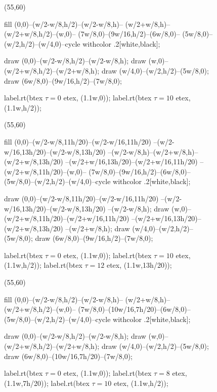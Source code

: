 \documentclass{manual}
\begin{document}
\begin{empfile}
\begin{figure}[tb]
  \centering
  \begin{empdef}(55,60)

    fill (0,0)--(w/2-w/8,h/2)--(w/2-w/8,h)--
         (w/2+w/8,h)--(w/2+w/8,h/2)--(w,0)--
         (7w/8,0)--(9w/16,h/2)--(6w/8,0)--
         (5w/8,0)--(w/2,h/2)--(w/4,0)--cycle
         withcolor .2[white,black];

    draw (0,0)--(w/2-w/8,h/2)--(w/2-w/8,h);
    draw (w,0)--(w/2+w/8,h/2)--(w/2+w/8,h);
    draw (w/4,0)--(w/2,h/2)--(5w/8,0);
    draw (6w/8,0)--(9w/16,h/2)--(7w/8,0);

    label.rt(btex $\tau=0$ etex, (1.1w,0));
    label.rt(btex $\tau=10$ etex, (1.1w,h/2));
  \end{empdef}
  \begin{empdef}(55,60)

    fill  (0,0)--(w/2-w/8,11h/20)--(w/2-w/16,11h/20)
         --(w/2-w/16,13h/20)--(w/2-w/8,13h/20)
         --(w/2-w/8,h)--(w/2+w/8,h)--(w/2+w/8,13h/20)
         --(w/2+w/16,13h/20)--(w/2+w/16,11h/20)
         --(w/2+w/8,11h/20)--(w,0)--
         (7w/8,0)--(9w/16,h/2)--(6w/8,0)--
         (5w/8,0)--(w/2,h/2)--(w/4,0)--cycle
         withcolor .2[white,black];

    draw (0,0)--(w/2-w/8,11h/20)--(w/2-w/16,11h/20)
         --(w/2-w/16,13h/20)--(w/2-w/8,13h/20)
         --(w/2-w/8,h);
    draw (w,0)--(w/2+w/8,11h/20)--(w/2+w/16,11h/20)
         --(w/2+w/16,13h/20)--(w/2+w/8,13h/20)
         --(w/2+w/8,h);
    draw (w/4,0)--(w/2,h/2)--(5w/8,0);
    draw (6w/8,0)--(9w/16,h/2)--(7w/8,0);

    label.rt(btex $\tau=0$ etex, (1.1w,0));
    label.rt(btex $\tau=10$ etex, (1.1w,h/2));
    label.rt(btex $\tau=12$ etex, (1.1w,13h/20));
  \end{empdef}
  \begin{empdef}(55,60)

    fill (0,0)--(w/2-w/8,h/2)--(w/2-w/8,h)--
         (w/2+w/8,h)--(w/2+w/8,h/2)--(w,0)--
         (7w/8,0)--(10w/16,7h/20)--(6w/8,0)--
         (5w/8,0)--(w/2,h/2)--(w/4,0)--cycle
         withcolor .2[white,black];

    draw (0,0)--(w/2-w/8,h/2)--(w/2-w/8,h);
    draw (w,0)--(w/2+w/8,h/2)--(w/2+w/8,h);
    draw (w/4,0)--(w/2,h/2)--(5w/8,0);
    draw (6w/8,0)--(10w/16,7h/20)--(7w/8,0);

    label.rt(btex $\tau=0$ etex, (1.1w,0));
    label.rt(btex $\tau=8$ etex, (1.1w,7h/20));
    label.rt(btex $\tau=10$ etex, (1.1w,h/2));
  \end{empdef}


\end{figure}
\end{empfile}
\end{document}
